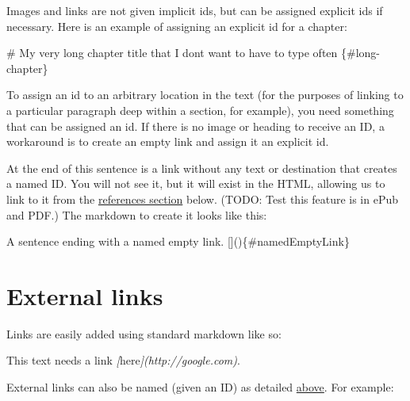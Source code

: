\documentclass[
]{book}
\newenvironment{Shaded}{\begin{snugshade}}{\end{snugshade}}
\newcommand{\CommentTok}[1]{\textcolor[rgb]{0.56,0.35,0.01}{\textit{#1}}}
\newcommand{\FunctionTok}[1]{\textcolor[rgb]{0.00,0.00,0.00}{#1}}
\newcommand{\NormalTok}[1]{#1}
\newcommand{\OtherTok}[1]{\textcolor[rgb]{0.56,0.35,0.01}{#1}}
\begin{document}
Images and links are not given implicit ids, but can be assigned explicit ids if necessary. Here is an example of assigning an explicit id for a chapter:

\begin{Shaded}
\begin{Highlighting}[]
\FunctionTok{\# My very long chapter title that I don\textquotesingle{}t want to have to type often \{\#long{-}chapter\}}
\end{Highlighting}
\end{Shaded}

To assign an id to an arbitrary location in the text (for the purposes of linking to a particular paragraph deep within a section, for example), you need something that can be assigned an id. If there is no image or heading to receive an ID, a workaround is to create an empty link and assign it an explicit id.

At the end of this sentence is a link without any text or destination that creates a named ID. \protect\hypertarget{namedEmptyLink}{\href{}{}} You will not see it, but it will exist in the HTML, allowing us to link to it from the \protect\hyperlink{references}{references section} below. (TODO: Test this feature is in ePub and PDF.) The markdown to create it looks like this:

\begin{Shaded}
\begin{Highlighting}[]
\NormalTok{A sentence ending with a named empty link. []()\{\#namedEmptyLink\}}
\end{Highlighting}
\end{Shaded}

\hypertarget{external-links}{%
\section{External links}\label{external-links}}

Links are easily added using standard markdown like so:

\begin{Shaded}
\begin{Highlighting}[]
\NormalTok{This text needs a link }\CommentTok{[}\OtherTok{here}\CommentTok{](http://google.com)}\NormalTok{.}
\end{Highlighting}
\end{Shaded}

External links can also be named (given an ID) as detailed \protect\hyperlink{assigning-ids}{above}. For example:
\end{document}
